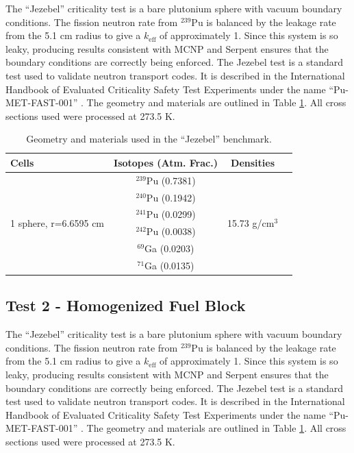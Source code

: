\documentclass[preprint,12pt]{elsarticle}
\begin{document}
The ``Jezebel'' criticality test is a bare plutonium sphere with vacuum boundary conditions.   The fission neutron rate from $^{239}$Pu is balanced by the leakage rate from the 5.1 cm radius to give a $k_\mathrm{eff}$ of approximately 1.  Since this system is so leaky, producing results consistent with MCNP and Serpent ensures that the boundary conditions are correctly being enforced.  The Jezebel test is a standard test used to validate neutron transport codes.  It is described in the International Handbook of Evaluated Criticality Safety Test Experiments under the name ``Pu-MET-FAST-001'' \cite{bench_handbook}.  The geometry and materials are outlined in Table \ref{jezebel_geom}.  All cross sections used were processed at 273.5 K.

\begin{table}[h]
\centering
\caption{Geometry and materials used in the ``Jezebel'' benchmark.}
\label{jezebel_geom}
\begin{tabular}{| l | c | c | c |}
\hline
Cells & Isotopes (Atm. Frac.)& Densities \\
\hline
\multirow{6}{*}{1 sphere, r=6.6595 cm }  &  $^{239}$Pu (0.7381) &    \multirow{6}{*}{15.73 g/cm$^3$} \\
                                         &  $^{240}$Pu (0.1942)    & \\
                                         &  $^{241}$Pu (0.0299)    & \\
                                         &  $^{242}$Pu (0.0038)    & \\
                                         &  $^{69}$Ga  (0.0203)    & \\
                                         &  $^{71}$Ga  (0.0135)     & \\ 
\hline
\end{tabular}
\end{table}

\subsection{Test 2 - Homogenized Fuel Block}

The ``Jezebel'' criticality test is a bare plutonium sphere with vacuum boundary conditions.   The fission neutron rate from $^{239}$Pu is balanced by the leakage rate from the 5.1 cm radius to give a $k_\mathrm{eff}$ of approximately 1.  Since this system is so leaky, producing results consistent with MCNP and Serpent ensures that the boundary conditions are correctly being enforced.  The Jezebel test is a standard test used to validate neutron transport codes.  It is described in the International Handbook of Evaluated Criticality Safety Test Experiments under the name ``Pu-MET-FAST-001'' \cite{bench_handbook}.  The geometry and materials are outlined in Table \ref{jezebel_geom}.  All cross sections used were processed at 273.5 K.
\end{document}

